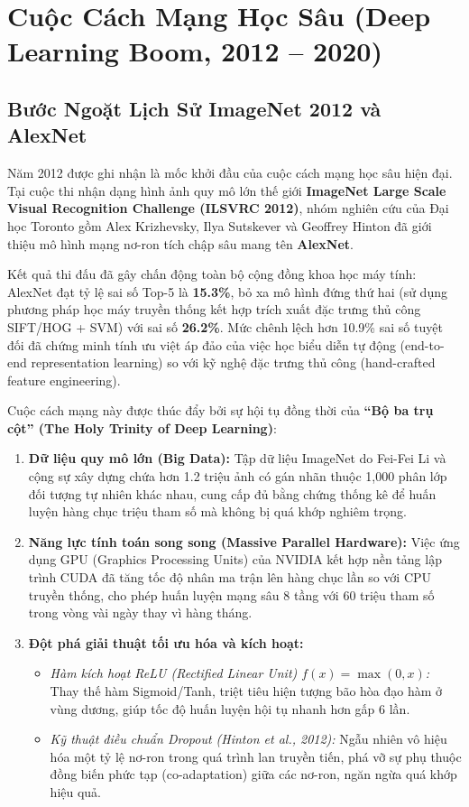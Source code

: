 \documentclass[12pt,a4paper]{report}
\begin{document}
\section{Cuộc Cách Mạng Học Sâu (Deep Learning Boom, 2012 -- 2020)}

\subsection{Bước Ngoặt Lịch Sử ImageNet 2012 và AlexNet}
Năm 2012 được ghi nhận là mốc khởi đầu của cuộc cách mạng học sâu hiện đại. Tại cuộc thi nhận dạng hình ảnh quy mô lớn thế giới \textbf{ImageNet Large Scale Visual Recognition Challenge (ILSVRC 2012)}, nhóm nghiên cứu của Đại học Toronto gồm Alex Krizhevsky, Ilya Sutskever và Geoffrey Hinton đã giới thiệu mô hình mạng nơ-ron tích chập sâu mang tên \textbf{AlexNet}.

Kết quả thi đấu đã gây chấn động toàn bộ cộng đồng khoa học máy tính: AlexNet đạt tỷ lệ sai số Top-5 là \textbf{15.3\%}, bỏ xa mô hình đứng thứ hai (sử dụng phương pháp học máy truyền thống kết hợp trích xuất đặc trưng thủ công SIFT/HOG + SVM) với sai số \textbf{26.2\%}. Mức chênh lệch hơn 10.9\% sai số tuyệt đối đã chứng minh tính ưu việt áp đảo của việc học biểu diễn tự động (end-to-end representation learning) so với kỹ nghệ đặc trưng thủ công (hand-crafted feature engineering).

Cuộc cách mạng này được thúc đẩy bởi sự hội tụ đồng thời của \textbf{“Bộ ba trụ cột” (The Holy Trinity of Deep Learning)}:
\begin{enumerate}[leftmargin=1.2cm]
    \item \textbf{Dữ liệu quy mô lớn (Big Data):} Tập dữ liệu ImageNet do Fei-Fei Li và cộng sự xây dựng chứa hơn 1.2 triệu ảnh có gán nhãn thuộc 1,000 phân lớp đối tượng tự nhiên khác nhau, cung cấp đủ bằng chứng thống kê để huấn luyện hàng chục triệu tham số mà không bị quá khớp nghiêm trọng.
    \item \textbf{Năng lực tính toán song song (Massive Parallel Hardware):} Việc ứng dụng GPU (Graphics Processing Units) của NVIDIA kết hợp nền tảng lập trình CUDA đã tăng tốc độ nhân ma trận lên hàng chục lần so với CPU truyền thống, cho phép huấn luyện mạng sâu 8 tầng với 60 triệu tham số trong vòng vài ngày thay vì hàng tháng.
    \item \textbf{Đột phá giải thuật tối ưu hóa và kích hoạt:}
    \begin{itemize}
        \item \textit{Hàm kích hoạt ReLU (Rectified Linear Unit) $f(x) = \max(0, x)$:} Thay thế hàm Sigmoid/Tanh, triệt tiêu hiện tượng bão hòa đạo hàm ở vùng dương, giúp tốc độ huấn luyện hội tụ nhanh hơn gấp 6 lần.
        \item \textit{Kỹ thuật điều chuẩn Dropout (Hinton et al., 2012):} Ngẫu nhiên vô hiệu hóa một tỷ lệ nơ-ron trong quá trình lan truyền tiến, phá vỡ sự phụ thuộc đồng biến phức tạp (co-adaptation) giữa các nơ-ron, ngăn ngừa quá khớp hiệu quả.
    \end{itemize}
\end{enumerate}
\end{document}
